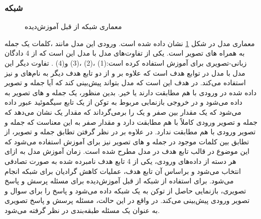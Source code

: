 \subsubsection{   شبکه }
	\begin{figure}
		\caption[معماری شبکه از قبل آموزش‌دیده]{معماری شبکه از قبل آموزش‌دیده \cite{chen2020uniter}}
		\label{fig:UNITER}
	\end{figure}
	معماری مدل 
	در شکل
	\ref{fig:UNITER}
	نشان داده شده است. ورودی این مدل مانند
	،کلمات یک جمله به همراه 
	های تصویر است. یکی از تفاوت‌های مدل 
	با مدل 
	این است که از 4 ‌دادگان زبانی-تصویری برای آموزش استفاده کرده است:(1)
	،(2)
	،(3)
	و(4)
	.
	تفاوت دیگر این مدل با مدل
	در توابع هدف است که علاوه بر
	و
	از دو تابع هدف دیگر به نام‌های
	و 
	نیز استفاده می‌کند. در
	هدف این است که مدل بتواند پیش‌بینی کند که آیا جمله و تصویر داده شده در ورودی با هم مطابقت دارند یا خیر. بدین منظور، یک جمله و 
	های تصویر به 
	داده می‌شود و در خروجی بازنمابی مربوط به توکن 
	\lr{[CLS]}
	از یک تابع سیگموئید عبور داده می‌شود که یک مقدار بین صفر و یک را برمی‌گرداند که مقدار یک نشان می‌دهد که جمله و تصویر ورودی کاملاً با هم مطابقت دارد و مقدار صفر به این معناست که جمله و تصویر ورودی با هم مطابقت ندارد. در 
	علاوه بر ‌در نظر گرفتن تطابق جمله و تصویر، از تطابق بین کلمات موجود در جمله و 
	های تصویر نیز برای آموزش استفاده می‌شود که این موضوع در قالب تابع هدف 
	در مدل مطرح شده است. زمان آموزش مدل 
	به ازای هر دسته از داده‌های ورودی، یکی از 4 تابع هدف نامبرده شده به صورت تصادفی انتخاب می‌شود و براساس آن تابع هدف، عملیات کاهش گرادیان برای شبکه انجام ‌می‌شود. برای استفاده از شبکه از قبل آموزش‌دیده
	برای مسئله پرسش و پاسخ تصویری، بازنمایی حاصل از توکن
	\lr{[CLS]}
	به یک شبکه 
	داده می‌شود و پاسخ را برای سوال و تصویر ورودی پیش‌بینی می‌کند. در واقع در این حالت، مسئله پرسش و پاسخ تصویری به عنوان یک مسئله طبقه‌بندی در نظر گرفته می‌شود.
	
